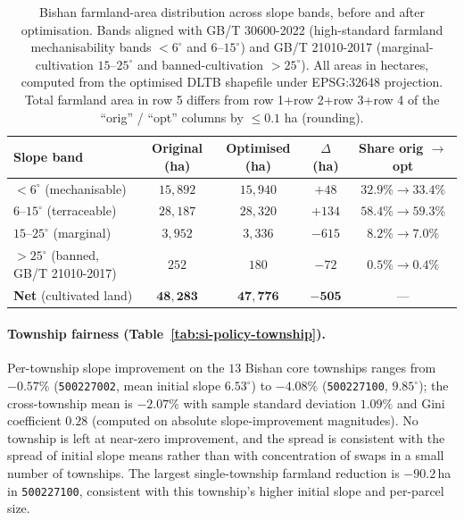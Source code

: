 \documentclass[11pt]{article}
\begin{document}
\begin{table}[htbp]
\centering
\small
\caption{Bishan farmland-area distribution across slope bands, before and after optimisation. Bands aligned with GB/T 30600-2022 (high-standard farmland mechanisability bands $<6^{\circ}$ and $6$--$15^{\circ}$) and GB/T 21010-2017 (marginal-cultivation $15$--$25^{\circ}$ and banned-cultivation $>25^{\circ}$). All areas in hectares, computed from the optimised DLTB shapefile under EPSG:32648 projection. Total farmland area in row 5 differs from row 1+row 2+row 3+row 4 of the ``orig'' / ``opt'' columns by $\le 0.1$ ha (rounding).}
\label{tab:si-policy-slope-bands}
\begin{tabular}{lcccc}
\toprule
Slope band & Original (ha) & Optimised (ha) & $\Delta$ (ha) & Share orig $\to$ opt \\
\midrule
$<6^{\circ}$ (mechanisable) & $15{,}892$ & $15{,}940$ & $+48$ & $32.9\% \to 33.4\%$ \\
$6$--$15^{\circ}$ (terraceable) & $28{,}187$ & $28{,}320$ & $+134$ & $58.4\% \to 59.3\%$ \\
$15$--$25^{\circ}$ (marginal) & $3{,}952$ & $3{,}336$ & $-615$ & $8.2\% \to 7.0\%$ \\
$>25^{\circ}$ (banned, GB/T 21010-2017) & $252$ & $180$ & $-72$ & $0.5\% \to 0.4\%$ \\
\midrule
\textbf{Net} (cultivated land) & $\mathbf{48{,}283}$ & $\mathbf{47{,}776}$ & $\mathbf{-505}$ & — \\
\bottomrule
\end{tabular}
\end{table}

\paragraph{Township fairness (Table~\ref{tab:si-policy-township}).} Per-township slope improvement on the $13$ Bishan core townships ranges from $-0.57\%$ (\texttt{500227002}, mean initial slope $6.53^{\circ}$) to $-4.08\%$ (\texttt{500227100}, $9.85^{\circ}$); the cross-township mean is $-2.07\%$ with sample standard deviation $1.09\%$ and Gini coefficient $0.28$ (computed on absolute slope-improvement magnitudes). No township is left at near-zero improvement, and the spread is consistent with the spread of initial slope means rather than with concentration of swaps in a small number of townships. The largest single-township farmland reduction is $-90.2$\,ha in \texttt{500227100}, consistent with this township's higher initial slope and per-parcel size.
\end{document}
